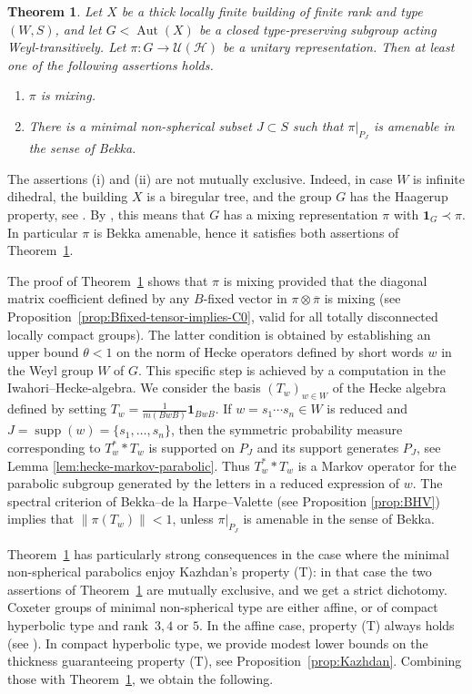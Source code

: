 \documentclass[12pt,a4paper]{amsproc}
\newtheorem{thmintro}{Theorem}
\theoremstyle{definition}
\DeclareMathOperator{\Aut}{Aut}
\DeclareMathOperator{\supp}{supp}
\newcommand{\cH}{\mathcal H}
\newcommand{\cU}{\mathcal U}
\newcommand{\one}{\mathbf 1}
\newcommand{\ol}[1]{\overline{#1}}
\newcommand{\weakcontain}{\prec}
\begin{document}
\begin{thmintro}
\label{theoremA}
Let $X$ be a thick locally finite building of finite rank and type $(W,S)$, and let $G<\Aut(X)$ be a closed type-preserving subgroup acting Weyl-transitively. Let $\pi \colon G\to\cU(\cH)$ be a   unitary representation. Then at least one of the following assertions holds.
\begin{enumerate}[label=\textup{(\roman*)},leftmargin=*]
\item $\pi$ is mixing.
\item There is a minimal non-spherical subset $J\subset S$ such that $\pi|_{P_J}$ is amenable in the sense of Bekka.
\end{enumerate}
\end{thmintro}

The assertions (i) and (ii) are not mutually exclusive. Indeed, in case $W$ is infinite dihedral, the building $X$ is a biregular tree, and the group  $G$ has the Haagerup property, see \cite[\S1.2.3]{CCJJV}. By \cite[Theorem~2.1.1]{CCJJV}, this means that $G$ has a mixing representation $\pi$ with $\one_G \weakcontain \pi$. In particular  $\pi$ is Bekka amenable, hence it satisfies both assertions of Theorem~\ref{theoremA}. 

The proof of Theorem~\ref{theoremA} shows that $\pi$ is mixing provided that the diagonal matrix coefficient defined by any $B$-fixed vector in $\pi \otimes \ol \pi$ is mixing (see Proposition~\ref{prop:Bfixed-tensor-implies-C0}, valid for all totally disconnected locally compact groups). The latter condition is obtained by establishing an upper bound $\theta < 1$  on the norm of Hecke operators defined by short words $w $ in the Weyl group $W$ of $G$. This specific step is achieved by a computation in the Iwahori--Hecke-algebra. We consider the   basis  $(T_w)_{w \in W}$ of the Hecke algebra defined by setting $T_w = \frac 1 {m(BwB)} \one_{BwB}$. If $w=s_1\cdots s_n \in W$ is reduced and $J=\supp(w)=\{s_1,\ldots,s_n\}$, then the symmetric probability measure corresponding to $T_w^* * T_w$ is supported on $P_J$ and its support generates $P_J$, see    Lemma \ref{lem:hecke-markov-parabolic}. Thus $T_w^* * T_w$ is a Markov operator for the parabolic subgroup generated by the letters in a reduced expression of $w$. The spectral criterion of Bekka--de la Harpe--Valette \cite[Proposition G.4.2]{BHV} (see Proposition \ref{prop:BHV}) implies that $\|\pi(T_w)\| <1$, unless $\pi|_{P_J}$ is amenable in the sense of Bekka. 

Theorem~\ref{theoremA} has particularly strong consequences in the case where  the minimal non-spherical parabolics enjoy Kazhdan's property (T): in that case the two assertions of Theorem~\ref{theoremA} are mutually exclusive, and we get a strict dichotomy. Coxeter groups of  minimal non-spherical type are either affine, or of compact hyperbolic type and rank~$3, 4$ or $5$. In the affine case, property (T) always holds (see \cite{Oppenheim}). In   compact hyperbolic type,  we provide modest lower bounds on the thickness guaranteeing property (T), see Proposition~\ref{prop:Kazhdan}. Combining those with Theorem~\ref{theoremA}, we obtain the following. 
\end{document}

